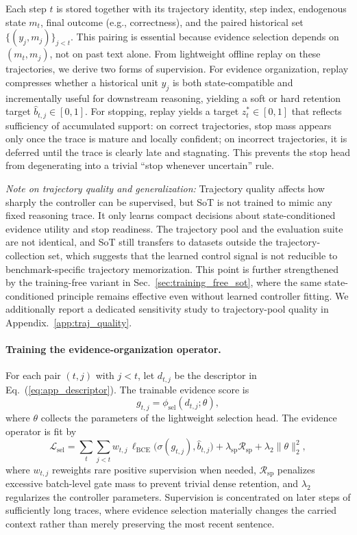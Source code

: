 Each step \(t\) is stored together with its trajectory identity, step index, endogenous state \(m_t\), final outcome (e.g., correctness), and the paired historical set \(\{(y_j,m_j)\}_{j<t}\). 
This pairing is essential because evidence selection depends on \((m_t,m_j)\), not on past text alone. 
From lightweight offline replay on these trajectories, we derive two forms of supervision. 
For evidence organization, replay compresses whether a historical unit \(y_j\) is both state-compatible and incrementally useful for downstream reasoning, yielding a soft or hard retention target \(\hat b_{t,j}\in[0,1]\). 
For stopping, replay yields a target \(z_t^{*}\in[0,1]\) that reflects sufficiency of accumulated support: on correct trajectories, stop mass appears only once the trace is mature and locally confident; on incorrect trajectories, it is deferred until the trace is clearly late and stagnating. 
This prevents the stop head from degenerating into a trivial ``stop whenever uncertain'' rule.

\emph{Note on trajectory quality and generalization:}
Trajectory quality affects how sharply the controller can be supervised, but SoT is not trained to mimic any fixed reasoning trace.
It only learns compact decisions about state-conditioned evidence utility and stop readiness.
The trajectory pool and the evaluation suite are not identical, and SoT still transfers to datasets outside the trajectory-collection set, which suggests that the learned control signal is not reducible to benchmark-specific trajectory memorization.
This point is further strengthened by the training-free variant in Sec.~\ref{sec:training_free_sot}, where the same state-conditioned principle remains effective even without learned controller fitting.
We additionally report a dedicated sensitivity study to trajectory-pool quality in Appendix.~\ref{app:traj_quality}.

\paragraph{Training the evidence-organization operator.}
For each pair \((t,j)\) with \(j<t\), let \(d_{t,j}\) be the descriptor in Eq.~(\ref{eq:app_descriptor}). 
The trainable evidence score is
\begin{equation}
g_{t,j}=\phi_{\mathrm{sel}}(d_{t,j};\theta),
\label{eq:app_keep_score}
\end{equation}
where \(\theta\) collects the parameters of the lightweight selection head. 
The evidence operator is fit by
\begin{equation}
\mathcal{L}_{\mathrm{sel}}
=
\sum_t \sum_{j<t} w_{t,j}\,
\ell_{\mathrm{BCE}}\!\bigl(\sigma(g_{t,j}), \hat b_{t,j}\bigr)
+\lambda_{\mathrm{sp}}\mathcal{R}_{\mathrm{sp}}
+\lambda_{2}\|\theta\|_2^2,
\label{eq:app_sel_loss}
\end{equation}
where \(w_{t,j}\) reweights rare positive supervision when needed, \(\mathcal{R}_{\mathrm{sp}}\) penalizes excessive batch-level gate mass to prevent trivial dense retention, and \(\lambda_{2}\) regularizes the controller parameters. 
Supervision is concentrated on later steps of sufficiently long traces, where evidence selection materially changes the carried context rather than merely preserving the most recent sentence.

